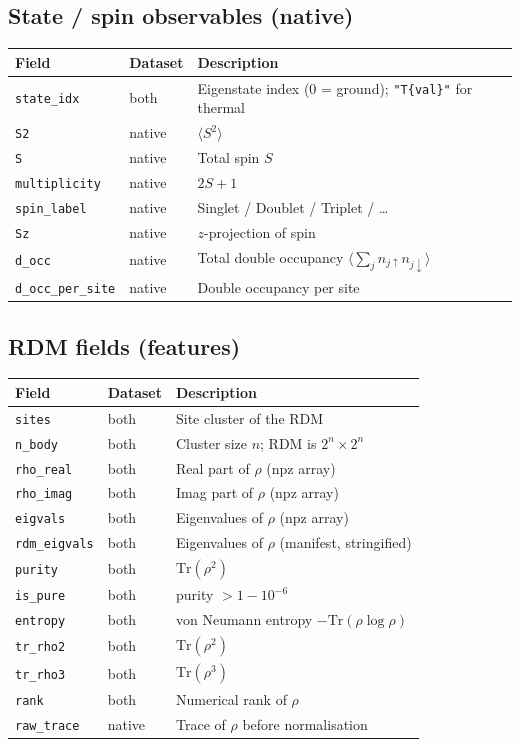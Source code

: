 \documentclass[11pt]{article}
\newcommand{\code}[1]{\texttt{\small #1}}
\begin{document}
\subsection{State / spin observables (native)}
\begin{longtable}{@{}p{2.4cm}p{1.6cm}p{9.3cm}@{}}
\toprule
Field & Dataset & Description \\ \midrule \endhead
\code{state\_idx}      & both   & Eigenstate index (0 = ground); \code{"T\{val\}"} for thermal \\
\code{S2}              & native & $\langle S^2\rangle$ \\
\code{S}               & native & Total spin $S$ \\
\code{multiplicity}    & native & $2S+1$ \\
\code{spin\_label}     & native & Singlet / Doublet / Triplet / \dots \\
\code{Sz}              & native & $z$-projection of spin \\
\code{d\_occ}          & native & Total double occupancy $\langle\sum_j n_{j\uparrow}n_{j\downarrow}\rangle$ \\
\code{d\_occ\_per\_site} & native & Double occupancy per site \\
\bottomrule
\end{longtable}

\subsection{RDM fields (features)}
\begin{longtable}{@{}p{2.4cm}p{1.6cm}p{9.3cm}@{}}
\toprule
Field & Dataset & Description \\ \midrule \endhead
\code{sites}       & both & Site cluster of the RDM \\
\code{n\_body}     & both & Cluster size $n$; RDM is $2^n\times2^n$ \\
\code{rho\_real}   & both & Real part of $\rho$ (npz array) \\
\code{rho\_imag}   & both & Imag part of $\rho$ (npz array) \\
\code{eigvals}     & both & Eigenvalues of $\rho$ (npz array) \\
\code{rdm\_eigvals} & both & Eigenvalues of $\rho$ (manifest, stringified) \\
\code{purity}      & both & $\mathrm{Tr}(\rho^2)$ \\
\code{is\_pure}    & both & purity $>1-10^{-6}$ \\
\code{entropy}     & both & von Neumann entropy $-\mathrm{Tr}(\rho\log\rho)$ \\
\code{tr\_rho2}    & both & $\mathrm{Tr}(\rho^2)$ \\
\code{tr\_rho3}    & both & $\mathrm{Tr}(\rho^3)$ \\
\code{rank}        & both & Numerical rank of $\rho$ \\
\code{raw\_trace}  & native & Trace of $\rho$ before normalisation \\
\bottomrule
\end{longtable}
\end{document}
